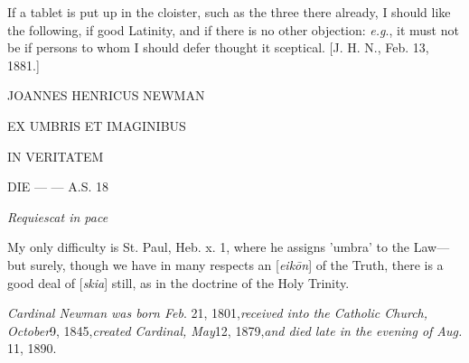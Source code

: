 If a tablet is put up in the
cloister, such as the three there already, I should like the following,
if good Latinity, and if there is no other objection: \emph{e.g}., it
must not be if persons to whom I should defer thought it sceptical. [J.
H. N., Feb. 13, 1881.]

JOANNES
HENRICUS NEWMAN

EX
UMBRIS ET IMAGINIBUS

IN
VERITATEM

DIE
— — A.S. 18

\emph{Requiescat
in pace}

My only difficulty is St. Paul,
Heb. x. 1, where he assigns 'umbra' to the Law—but surely, though we
have in many respects an [\emph{eik\={o}n}] of the Truth, there is a
good deal of [\emph{skia}] still, as in the doctrine of the Holy
Trinity.

\emph{Cardinal Newman was born Feb}.
21, 1801,\emph{received into the Catholic Church, October}9, 1845,\emph{created Cardinal, May}12, 1879,\emph{and died late in the evening of
Aug.} 11, 1890.
